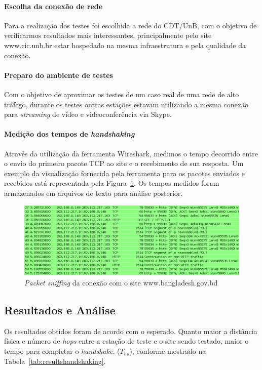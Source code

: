 \documentclass[12pt,a4paper]{report}
\begin{document}
\paragraph{Escolha da conexão de rede} Para a realização dos testes foi escolhida a rede do CDT/UnB, com o objetivo de verificarmos resultados mais interessantes, principalmente pelo site www.cic.unb.br estar hospedado na mesma infraestrutura e pela qualidade da conexão.

\paragraph{Preparo do ambiente de testes} Com o objetivo de aproximar os testes de um caso real de uma rede de alto tráfego, durante os testes outras estações estavam utilizando a mesma conexão para \textit{streaming} de vídeo e videoconferência via Skype.

\paragraph{Medição dos tempos de \textit{handshaking}} Através da utilização da ferramenta Wireshark, medimos o tempo decorrido entre o envio do primeiro pacote TCP ao site e o recebimento de sua resposta. Um exemplo da visualização fornecida pela ferramenta para os pacotes enviados e recebidos está representada pela Figura~\ref{fig:wirebangladesh}. Os tempos medidos foram armazenados em arquivos de texto para análise posterior.

\begin{figure}[h]
\centering
\includegraphics[width=\textwidth]{bangladesh.png}
\caption{\textit{Packet sniffing} da conexão com o site www.bangladesh.gov.bd}
\label{fig:wirebangladesh}
\end{figure}

\subsection{Resultados e Análise}

Os resultados obtidos foram de acordo com o esperado. Quanto maior a distância física e número de \textit{hops} entre a estação de teste e o site sendo testado, maior o tempo para completar o \textit{handshake}, (\(T_{hs}\)), conforme mostrado na Tabela~\ref{tab:resultshandshaking}.
\end{document}
